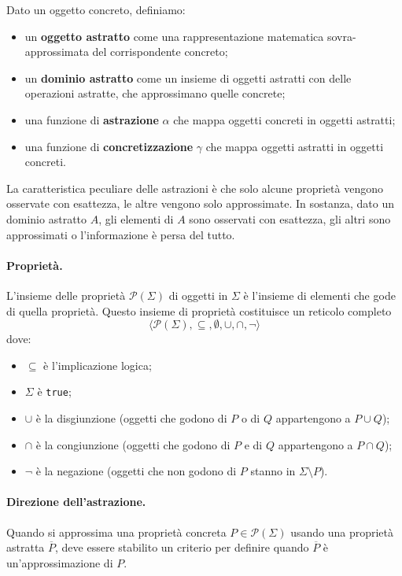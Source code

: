\documentclass[a4paper, 10pt]{article}
\newcommand{\parts}[1]{\mathcal{P}(#1)}
\begin{document}
	Dato un oggetto concreto, definiamo:
	\begin{itemize}
		\item un \textbf{oggetto astratto} come una rappresentazione matematica sovra-approssimata del corrispondente concreto;
		\item un \textbf{dominio astratto} come un insieme di oggetti astratti con delle operazioni astratte, che approssimano quelle concrete;
		\item una funzione di \textbf{astrazione} $\alpha$ che mappa oggetti concreti in oggetti astratti;
		\item una funzione di \textbf{concretizzazione} $\gamma$ che mappa oggetti astratti in oggetti concreti.
	\end{itemize}
	
	La caratteristica peculiare delle astrazioni è che solo alcune proprietà vengono osservate con esattezza, le altre vengono solo approssimate. In sostanza, dato un dominio astratto $A$, gli elementi di $A$ sono osservati con esattezza, gli altri sono approssimati o l'informazione è persa del tutto.
	
	\paragraph{Proprietà.} L'insieme delle proprietà $\parts{\Sigma}$ di oggetti in $\Sigma$ è l'insieme di elementi che gode di quella proprietà. Questo insieme di proprietà costituisce un reticolo completo \[ \langle \parts{\Sigma}, \subseteq, \emptyset, \cup, \cap, \neg \rangle \] dove:
	\begin{itemize}
		\item $\subseteq$ è l'implicazione logica;
		\item $\Sigma$ è \verb|true|;
		\item $\cup$ è la disgiunzione (oggetti che godono di $P$ o di $Q$ appartengono a $P \cup Q$);
		\item $\cap$ è la congiunzione (oggetti che godono di $P$ e di $Q$ appartengono a $P \cap Q$);
		\item $\neg$ è la negazione (oggetti che non godono di $P$ stanno in $\Sigma \setminus P$).
	\end{itemize}

	\paragraph{Direzione dell'astrazione.}
	Quando si approssima una proprietà concreta $P \in \parts{\Sigma}$ usando una proprietà astratta $\overline{P}$, deve essere stabilito un criterio per definire quando $\overline{P}$ è un'approssimazione di $P$.
	
\end{document}
